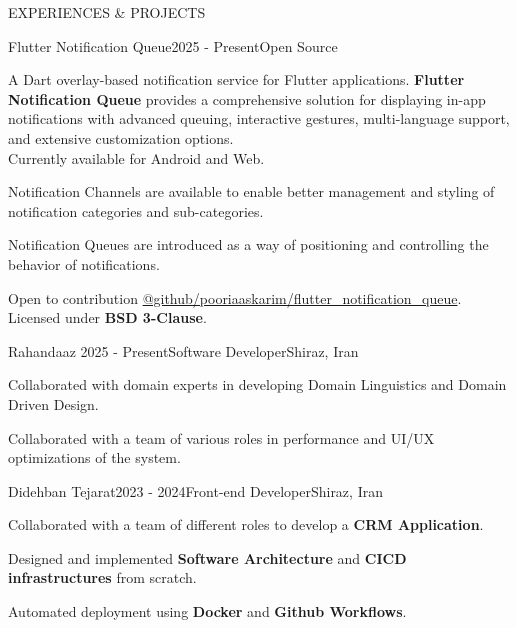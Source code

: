 \documentclass[
    a4paper, %
    12pt, %
]{resume.cls} %
\begin{document}
\begin{rSection}{EXPERIENCES \& PROJECTS}
\bigskip
    \begin{rSubsection}{Flutter Notification Queue}{2025 - Present}{Open Source}{}
		\item A Dart overlay-based notification service for Flutter applications. \textbf{Flutter Notification Queue} provides a comprehensive solution for displaying in-app notifications with advanced queuing, interactive gestures, multi-language support, and extensive customization options.\\
        Currently available for Android and Web. 
        \item Notification Channels are available to enable better management and styling of notification categories and sub-categories.
        \item Notification Queues are introduced as a way of positioning and controlling the behavior of notifications.
		\item Open to contribution \href{https://github.com/pooriaaskarim/flutter\_notification\_queue}{@github/pooriaaskarim/flutter\_notification\_queue}.  Licensed under \textbf{BSD 3-Clause}. 
        \\      
	\end{rSubsection}
    
    \begin{rSubsection}{Rahandaaz} {2025 - Present}{Software Developer}{Shiraz, Iran}
		\item Collaborated with domain experts in developing Domain Linguistics and Domain Driven Design.
		\item Collaborated with a team of various roles in performance and UI/UX optimizations of the system.
        \\         
	\end{rSubsection}
    
	\begin{rSubsection}{Didehban Tejarat}{2023 - 2024}{Front-end Developer}{Shiraz, Iran}
		\item Collaborated with a team of different roles to develop a \textbf{CRM Application}.
		\item Designed and implemented \textbf{Software Architecture} and \textbf{CICD infrastructures} from scratch.
        \item Automated deployment using \textbf{Docker} and \textbf{Github Workflows}.
        \\      
	\end{rSubsection}


\end{rSection}
\end{document}
